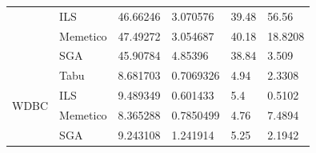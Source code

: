 \documentclass[11pt]{article}
\begin{document}
\begin{table}[h]
{\begin{tabular}{ |l|l|l|l|l|l| }
                              & ILS      & 46.66246   & 3.070576     & 39.48   & 56.56 \\
                              & Memetico & 47.49272   & 3.054687     & 40.18   & 18.8208 \\
                              & SGA      & 45.90784   & 4.85396      & 38.84   & 3.509\\ \hline
    \multirow{4}{*}{WDBC} & Tabu     & 8.681703   & 0.7069326    & 4.94    & 2.3308 \\
                          & ILS      & 9.489349   & 0.601433     & 5.4     & 0.5102 \\
                          & Memetico & 8.365288   & 0.7850499    & 4.76    & 7.4894 \\
                          & SGA      & 9.243108   & 1.241914     & 5.25    & 2.1942\\ \hline
\end{tabular}
}
\end{table}

\begin{table}[h]
\end{table}
\end{document}
